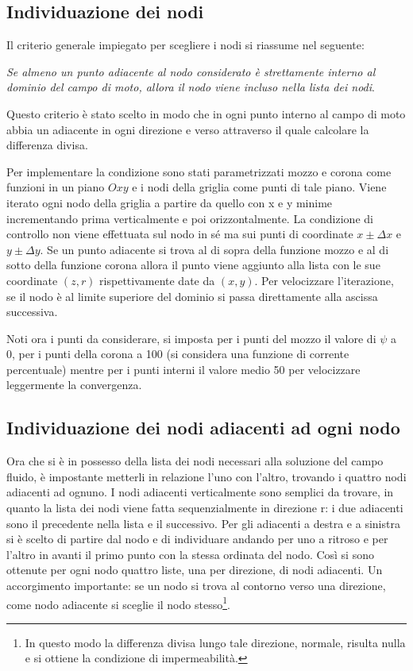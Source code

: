\documentclass{tufte-handout}
\begin{document}
\subsection{Individuazione dei nodi}
Il criterio generale impiegato per scegliere i nodi si riassume nel seguente:

\emph{Se almeno un punto adiacente al nodo considerato è strettamente interno al dominio del campo di moto, allora il nodo viene incluso nella lista dei nodi}.

Questo criterio è stato scelto in modo che in ogni punto interno al campo di moto abbia un adiacente in ogni direzione e verso attraverso il quale calcolare la differenza divisa.

Per implementare la condizione sono stati parametrizzati mozzo e corona come funzioni in un piano $Oxy$ e i nodi della griglia come punti di tale piano.
Viene iterato ogni nodo della griglia a partire da quello con x e y minime incrementando prima verticalmente e poi orizzontalmente.
La condizione di controllo non viene effettuata sul nodo in sé ma sui punti di coordinate $x \pm \Delta x$ e $y \pm \Delta y$.
Se un punto adiacente si trova al di sopra della funzione mozzo e al di sotto della funzione corona allora il punto viene aggiunto alla lista con le sue coordinate $(z,r)$ rispettivamente date da $(x,y)$. 
Per velocizzare l'iterazione, se il nodo è al limite superiore del dominio si passa direttamente alla ascissa successiva.

Noti ora i punti da considerare, si imposta per i punti del mozzo il valore di $\psi$ a 0, per i punti della corona a 100 (si considera una funzione di corrente percentuale) mentre per i punti interni il valore medio 50 per velocizzare leggermente la convergenza.


\subsection{Individuazione dei nodi adiacenti ad ogni nodo}
Ora che si è in possesso della lista dei nodi necessari alla soluzione del campo fluido, è impostante metterli in relazione l'uno con l'altro, trovando i quattro nodi adiacenti ad ognuno.
I nodi adiacenti verticalmente sono semplici da trovare, in quanto la lista dei nodi viene fatta sequenzialmente in direzione r: i due adiacenti sono il precedente nella lista e il successivo.
Per gli adiacenti a destra e a sinistra si è scelto di partire dal nodo e di individuare andando per uno a ritroso e per l'altro in avanti il primo punto con la stessa ordinata del nodo. Così si sono ottenute per ogni nodo quattro liste, una per direzione, di nodi adiacenti.
Un accorgimento importante: se un nodo si trova al contorno verso una direzione, come nodo adiacente si sceglie il nodo stesso\footnote{In questo modo la differenza divisa lungo tale direzione, normale, risulta nulla e si ottiene la condizione di impermeabilità.}.
\end{document}
